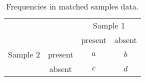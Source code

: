 
\begin{center}
\begin{longtable}{cccc}
\caption{Frequencies in matched samples data. \label{SI:mcnemartab}} \\
 & & \multicolumn{2}{c}{Sample 1} \\
 & & present & absent \\
Sample 2 & present & $a$ & $b$ \\
         & absent  & $c$ & $d$ \\
\end{longtable}
\end{center}

